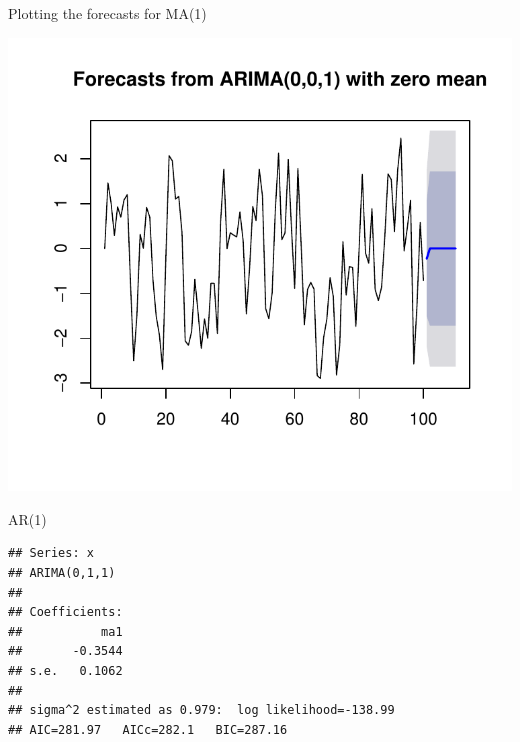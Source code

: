\begin{frame}[fragile]{Plotting the forecasts for MA(1)}
  
\begin{knitrout}
\color{fgcolor}\begin{kframe}
\begin{alltt}
\end{alltt}
\end{kframe}
\includegraphics[width=\maxwidth]{figure/catanzaro-1} 

\end{knitrout}
  
\end{frame}

\begin{frame}[fragile]{AR(1)}
  
\begin{knitrout}
\color{fgcolor}\begin{kframe}
\begin{alltt}
\hlkwb{=}
\end{alltt}
\begin{verbatim}
## Series: x 
## ARIMA(0,1,1)                    
## 
## Coefficients:
##           ma1
##       -0.3544
## s.e.   0.1062
## 
## sigma^2 estimated as 0.979:  log likelihood=-138.99
## AIC=281.97   AICc=282.1   BIC=287.16
\end{verbatim}
\end{kframe}
\end{knitrout}
  
\end{frame}

